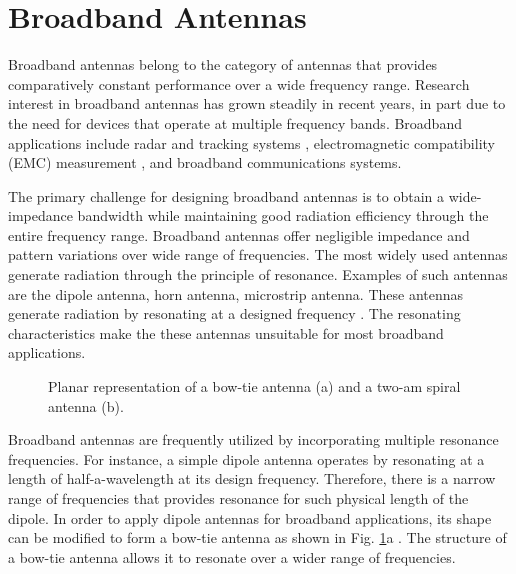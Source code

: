 \section{Broadband Antennas}

Broadband antennas belong to the category of antennas that provides comparatively constant performance over a wide frequency range. Research interest in broadband antennas has grown steadily in recent years, in part due to the need for devices that operate at multiple frequency bands. Broadband applications include radar and tracking systems \cite{Jackson2004,Arslan2006,Begaud2013}, electromagnetic compatibility (EMC) measurement \cite{paul2006}\cite{Botello-Perez2005}, and broadband communications systems. 

The primary challenge for designing broadband antennas is to obtain a wide-impedance bandwidth while maintaining good radiation efficiency through the entire frequency range. Broadband antennas offer negligible impedance and pattern variations over wide range of frequencies. The most widely used antennas generate radiation through the principle of resonance. Examples of such antennas are the dipole antenna, horn antenna, microstrip antenna. These antennas generate radiation by resonating at a designed frequency \cite{james1989}. The resonating characteristics make the these antennas unsuitable for most broadband applications.
%
\begin{figure} [t!]
\centering
  \noindent
\hspace*{\fill}%
	\noindent
	\mbox{}
\hspace*{\fill}%
  \mbox{}
	  \hspace*{\fill}%
  \caption[Planar representation of bow-tie and two-am spiral antennas.]{Planar representation of a bow-tie antenna \cite{Shafai2007} (a) and a two-am spiral antenna \cite{Gao2013} (b). }
\label{fig:broadband}
\end{figure}
%
Broadband antennas are frequently utilized by incorporating multiple resonance frequencies. For instance, a simple dipole antenna operates by resonating at a length of half-a-wavelength at its design frequency. Therefore, there is a narrow range of frequencies that provides resonance for such physical length of the dipole. In order to apply dipole antennas for broadband applications, its shape can be modified to form a bow-tie antenna as shown in Fig. \ref{fig:broadband}a \cite{Balanis2005}. The structure of a bow-tie antenna allows it to resonate over a wider range of frequencies.

